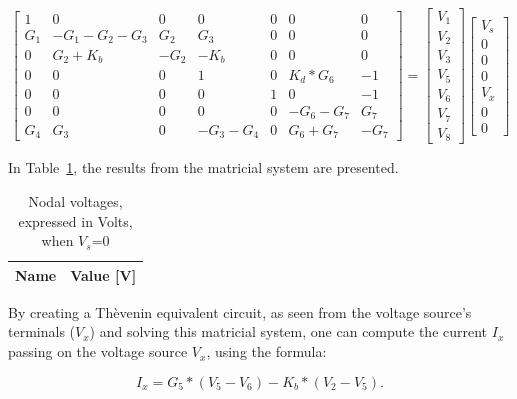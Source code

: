 $$
\begin{bmatrix}
  1 & 0 & 0 & 0 & 0 & 0 & 0 \\
  G_{1} & -G_{1}-G_{2}-G_{3} & G_{2} & G_{3} & 0 & 0 & 0 \\
  0 & G_{2}+K_{b} & -G_{2} & -K_{b} & 0 & 0 & 0 \\
  0 & 0 & 0 & 1 & 0 & K_{d}*G_{6} & -1 \\
  0 & 0 & 0 & 0 & 1 & 0 & -1 \\
  0 & 0 & 0 & 0 & 0 & -G_{6}-G_{7} & G_{7} \\
  G_{4} & G_{3} & 0 & -G_{3}-G_{4} & 0 & G_{6}+G_{7} & -G_{7}
\end{bmatrix}
=
\begin{bmatrix}
  V_{1}\\
  V_{2}\\
  V_{3}\\
  V_{5}\\
  V_{6}\\
  V_{7}\\
  V_{8}
\end{bmatrix}
\begin{bmatrix}
  V_{s}\\
  0\\
  0\\
  0\\
  V_{x}\\
  0\\
  0
\end{bmatrix}
$$

In Table~\ref{tab:volt2}, the results from the matricial system are presented.\par

\begin{table} [H]
  \centering
  \begin{tabular}{|l|r|}
    \hline    
    {\bf Name} & {\bf Value [V]} \\ \hline
    
  \end{tabular}
  \caption{Nodal voltages, expressed in Volts, when $V_s$=0}
  \label{tab:volt2}
\end{table}

By creating a Thèvenin equivalent circuit, as seen from the voltage source's
terminals ($V_x$) and solving this matricial system, one can compute the current
$I_x$ passing on the voltage source $V_x$, using the formula:\par

\begin{equation}
  I_x = G_5 * (V_5 - V_6) - K_b * (V_2 - V_5).
  \label{eq:Ix}
\end{equation}

